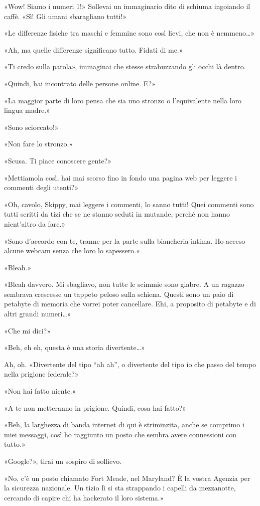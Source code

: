 «Wow! Siamo i numeri 1!» Sollevai un immaginario dito di schiuma
ingoiando il caffè. «Sì! Gli umani sbaragliano tutti!»

«Le differenze fisiche tra maschi e femmine sono così lievi, che non è
nemmeno\ldots»

«Ah, ma quelle differenze significano tutto. Fidati di me.»

«Ti credo sulla parola», immaginai che stesse strabuzzando gli occhi là
dentro.

«Quindi, hai incontrato delle persone online. E?»

«La maggior parte di loro pensa che sia uno stronzo o l'equivalente
nella loro lingua madre.»

«Sono scioccato!»

«Non fare lo stronzo.»

«Scusa. Ti piace conoscere gente?»

«Mettiamola così, hai mai scorso fino in fondo una pagina web per
leggere i commenti degli utenti?»

«Oh, cavolo, Skippy, mai leggere i commenti, lo sanno tutti! Quei
commenti sono tutti scritti da tizi che se ne stanno seduti in mutande,
perché non hanno nient'altro da fare.»

«Sono d'accordo con te, tranne per la parte sulla biancheria intima. Ho
acceso alcune webcam senza che loro lo sapessero.»

«Bleah.»

«Bleah davvero. Mi sbagliavo, non tutte le scimmie sono glabre. A un
ragazzo sembrava crescesse un tappeto peloso sulla schiena. Questi sono
un paio di petabyte di memoria che vorrei poter cancellare. Ehi, a
proposito di petabyte e di altri grandi numeri\ldots»

«Che mi dici?»

«Beh, eh eh, questa è una storia divertente\ldots»

Ah, oh. «Divertente del tipo ``ah ah'', o divertente del tipo io che
passo del tempo nella prigione federale?»

«Non hai fatto niente.»

«A te non metteranno in prigione. Quindi, cosa hai fatto?»

«Beh, la larghezza di banda internet di qui è striminzita, anche se
comprimo i miei messaggi, così ho raggiunto un posto che sembra avere
connessioni con tutto.»

«Google?», tirai un sospiro di sollievo.

«No, c'è un posto chiamato Fort Meade, nel Maryland? È la vostra Agenzia
per la sicurezza nazionale. Un tizio lì si sta strappando i capelli da
mezzanotte, cercando di capire chi ha hackerato il loro sistema.»

